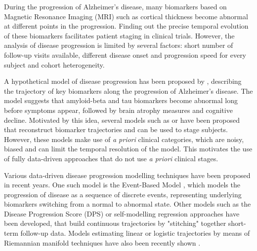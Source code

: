 \documentclass{llncs}
\begin{document}

During the progression of Alzheimer's disease, many biomarkers based on Magnetic Resonance Imaging (MRI) such as cortical thickness become abnormal at different points in the progression. Finding out the precise temporal evolution of these biomarkers facilitates patient staging in clinical trials. However, the analysis of disease progression is limited by several factors: short number of follow-up visits available, different disease onset and progression speed for every subject and cohort heterogeneity. 

A hypothetical model of disease progression has been proposed by \cite{jack2010hypothetical}, describing the trajectory of key biomarkers along the progression of Alzheimer's disease. The model suggests that amyloid-beta and tau biomarkers become abnormal long before symptoms appear, followed by brain atrophy measures and cognitive decline. Motivated by this idea, several models such as \cite{bateman2012clinical} or \cite{richberg2015multi} have been proposed that reconstruct biomarker trajectories and can be used to stage subjects. However, these models make use of \emph{a priori} clinical categories, which are noisy, biased and can limit the temporal resolution of the model. This motivates the use of fully data-driven approaches that do not use \emph{a priori} clinical stages. 

Various data-driven disease progression modelling techniques have been proposed in recent years. One such model is the Event-Based Model \cite{fonteijn2012event}, which models the progression of disease as a sequence of discrete events, representing underlying biomarkers switching from a normal to abnormal state. Other models such as the Disease Progression Score (DPS) \cite{jedynak2012} or self-modelling regression approaches \cite{donohue2014estimating} have been developed, that build continuous trajectories by "stitching" together short-term follow-up data. Models estimating linear or logistic trajectories by means of Riemannian manifold techniques have also been recently shown \cite{schiratti2015mixed}.
\end{document}
